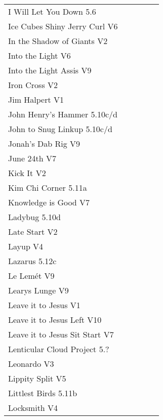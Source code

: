 \begin{flushleft}
\begin{center}
\begin{supertabular}{p{0.76\linewidth}p{0.08\linewidth}}
I Will Let You Down 5.6 & \pageref{rt:I Will Let You Down} \\
Ice Cubes Shiny Jerry Curl V6 & \pageref{rt:Ice Cubes Shiny Jerry Curl} \\
In the Shadow of Giants V2 & \pageref{rt:In the Shadow of Giants} \\
Into the Light V6 & \pageref{rt:Into the Light} \\
Into the Light Assis V9 & \pageref{vr:Into the Light Assis} \\
Iron Cross V2 & \pageref{vr:Iron Cross} \\
Jim Halpert V1 & \pageref{rt:Jim Halpert} \\
John Henry's Hammer 5.10c/d & \pageref{rt:John Henry's Hammer} \\
John to Snug Linkup 5.10c/d & \pageref{vr:John to Snug Linkup} \\
Jonah's Dab Rig V9 & \pageref{rt:Jonah's Dab Rig} \\
June 24th V7 & \pageref{rt:June 24th} \\
Kick It V2 & \pageref{rt:Kick It} \\
Kim Chi Corner 5.11a & \pageref{rt:Kim Chi Corner} \\
Knowledge is Good V7 & \pageref{vr:Knowledge is Good} \\
Ladybug 5.10d & \pageref{rt:Ladybug} \\
Late Start V2 & \pageref{vr:Late Start} \\
Layup V4 & \pageref{vr:Layup} \\
Lazarus 5.12c & \pageref{vr:Lazarus} \\
Le Lemét V9 & \pageref{rt:Le Lemét} \\
Learys Lunge V9 & \pageref{vr:Learys Lunge} \\
Leave it to Jesus V1 & \pageref{rt:Leave it to Jesus} \\
Leave it to Jesus Left V10 & \pageref{vr:Leave it to Jesus Left} \\
Leave it to Jesus Sit Start V7 & \pageref{vr:Leave it to Jesus Sit Start} \\
Lenticular Cloud Project 5.? & \pageref{rt:Lenticular Cloud Project} \\
Leonardo V3 & \pageref{rt:Leonardo} \\
Lippity Split V5 & \pageref{rt:Lippity Split} \\
Littlest Birds 5.11b & \pageref{rt:Littlest Birds} \\
Locksmith V4 & \pageref{rt:Locksmith} \\

\end{supertabular}
\end{center}
\end{flushleft}
